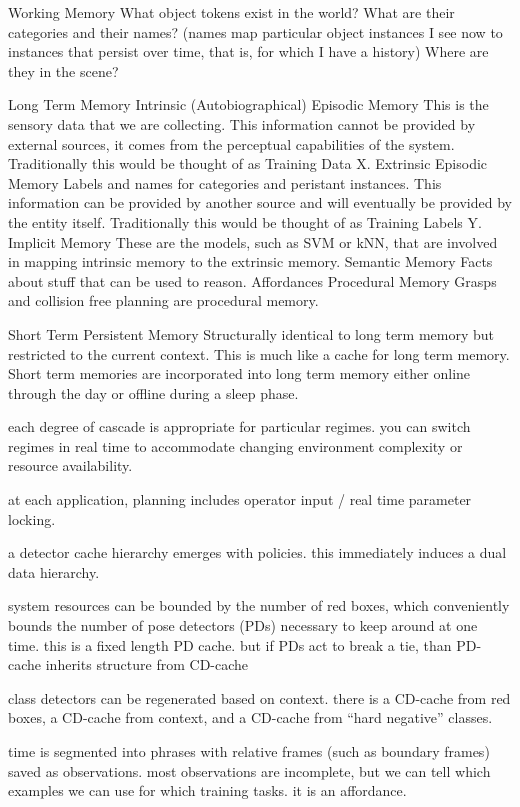 \documentclass[conference]{IEEEtran}
\begin{document}
Working Memory
  What object tokens exist in the world? 
  What are their categories and their names? 
    (names map particular object instances I see now to instances that persist over
     time, that is, for which I have a history)
  Where are they in the scene?
  
Long Term Memory
  Intrinsic (Autobiographical) Episodic Memory
    This is the sensory data that we are collecting.
    This information cannot be provided by external
    sources, it comes from the perceptual capabilities of the system.
    Traditionally this would be thought of as Training Data X.
  Extrinsic Episodic Memory
    Labels and names for categories and peristant instances.
    This information can be provided by another source and will
    eventually be provided by the entity itself.
    Traditionally this would be thought of as Training Labels Y.
  Implicit Memory
    These are the models, such as SVM or kNN, that are involved in
    mapping intrinsic memory to the extrinsic memory.
  Semantic Memory
    Facts about stuff that can be used to reason. Affordances
  Procedural Memory
    Grasps and collision free planning are procedural memory.

Short Term Persistent Memory
  Structurally identical to long term memory but restricted to the current context.
  This is much like a cache for long term memory. Short term memories are incorporated 
  into long term memory either online through the day or offline during a sleep phase.


each degree of cascade is appropriate for particular regimes. you can switch regimes in 
real time to accommodate changing environment complexity or resource availability.

at each application, planning includes operator input / real time parameter locking.

a detector cache hierarchy emerges with policies. this immediately induces a dual data hierarchy.

system resources can be bounded by the number of red boxes, which conveniently bounds 
the number of pose detectors (PDs) necessary to keep around at one time. this is a 
fixed length PD cache. but if PDs act to break a tie, than PD-cache inherits structure from CD-cache

class detectors can be regenerated based on context. there is a CD-cache from red 
boxes, a CD-cache from context, and a CD-cache from “hard negative” classes.

time is segmented into phrases with relative frames (such as boundary frames) saved 
as observations. most observations are incomplete, but we can tell which examples we 
can use for which training tasks.  it is an affordance.
\end{document}
